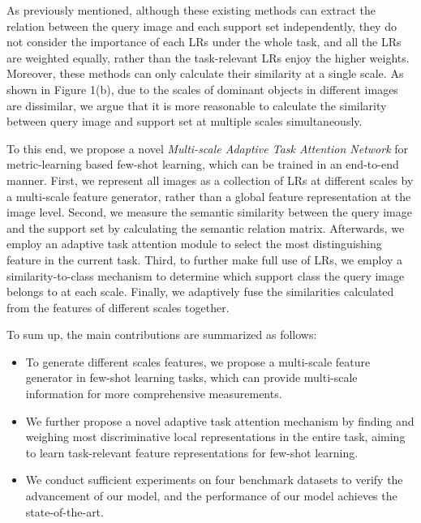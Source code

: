 \documentclass[final]{cvpr}
\begin{document}
	As previously mentioned, although these existing methods can extract the relation between the query image and each support set independently, they do not consider the importance of each LRs under the whole task, and all the LRs are weighted equally, rather than the task-relevant LRs enjoy the higher weights. Moreover, these methods can only calculate their similarity at a single scale. As shown in Figure 1(b), due to the scales of dominant objects in different images are dissimilar, we argue that it is more reasonable to calculate the similarity between query image and support set at multiple scales simultaneously.
	
	To this end, we propose a novel \emph{Multi-scale Adaptive Task Attention Network} for metric-learning based few-shot learning, which can be trained in an end-to-end manner. First, we represent all images as a collection of LRs at different scales by a multi-scale feature generator, rather than a global feature representation at the image level. Second, we measure the semantic similarity between the query image and the support set by calculating the semantic relation matrix. Afterwards, we employ an adaptive task attention module to select the most distinguishing feature in the current task. Third, to further make full use of LRs, we employ a similarity-to-class mechanism to determine which support class the query image belongs to at each scale. Finally, we adaptively fuse the similarities calculated from the features of different scales together.
	
	 To sum up, the main contributions are summarized as follows:
	\begin{itemize}
		\setlength{\itemsep}{0pt}
		\setlength{\parsep}{0pt}
		\setlength{\parskip}{0pt}
		\item To generate different scales features, we propose a multi-scale feature generator in few-shot learning tasks, which can provide multi-scale information for more comprehensive measurements.
		\item We further propose a novel adaptive task attention mechanism by finding and weighing most discriminative local representations in the entire task, aiming to learn task-relevant feature representations for few-shot learning.
		\item We conduct sufficient experiments on four benchmark datasets to verify the advancement of our model, and the performance of our model achieves the state-of-the-art.
	\end{itemize}
	
	
	
\end{document}
